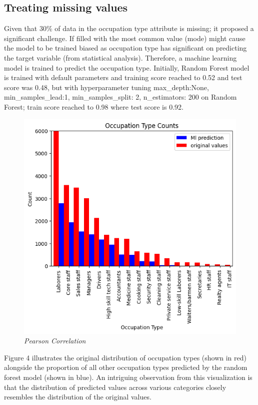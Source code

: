 \documentclass[10pt]{article}
\begin{document}
\begin{multicols}{2}
\section{Treating missing values}
Given that 30\% of data in the occupation type attribute is missing; it proposed a significant challenge.  If filled with the most common value (mode) might cause the model to be trained biased as occupation type has significant on predicting the target variable (from statistical analysis). Therefore, a machine learning model is trained to predict the occupation type. Initially, Random Forest model is trained with default parameters and training score reached to 0.52 and test score was 0.48, but with hyperparameter tuning {max\_depth:None, min\_samples\_lead:1, min\_samples\_split: 2, n\_estimators: 200} on Random Forest; train score reached to 0.98 where test score is 0.92.
\begin{figure}[H]
    \centering
    \includegraphics[width=1\linewidth]{figure4.png}
    \caption{\justifying \textit{Pearson Correlation}}
    \label{fig:PID Fuzzy}
\end{figure}

Figure 4 illustrates the original distribution of occupation types (shown in red) alongside the proportion of all other occupation types predicted by the random forest model (shown in blue). An intriguing observation from this visualization is that the distribution of predicted values across various categories closely resembles the distribution of the original values.


\end{multicols}
\end{document}
